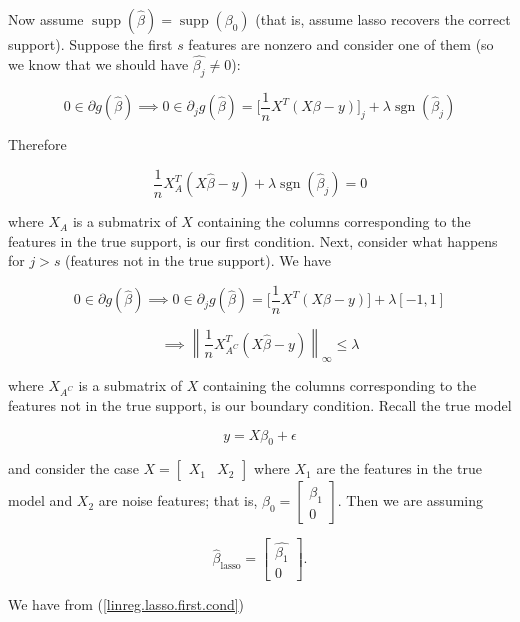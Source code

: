 Now assume \(\operatorname{supp}(\hat{\beta}) = \operatorname{supp}(\beta_0)\) (that is, assume lasso recovers the correct support). Suppose the first \(s\) features are nonzero and consider one of them (so we know that we should have \(\hat{\beta_j} \neq 0\)):

\[
0 \in \partial g(\hat{\beta}) \implies 0 \in \partial_j g(\hat{\beta}) = \bigg[ \frac{1}{n} X^T(X \beta - y) \bigg]_j + \lambda \operatorname{sgn}(\hat{\beta}_j) 
\]

Therefore

\begin{equation}\label{linreg.lasso.first.cond}
\frac{1}{n} X_A^T(X \hat{\beta} - y) + \lambda  \operatorname{sgn}(\hat{\beta}_j) = 0
\end{equation}

where \(X_A\) is a submatrix of \(X\) containing the columns corresponding to the features in the true support, is our first condition. Next, consider what happens for \(j > s\) (features not in the true support). We have

\[
0 \in \partial g(\hat{\beta}) \implies 0 \in \partial_j g(\hat{\beta}) = \bigg[ \frac{1}{n}X^T(X \beta - y) \bigg] + \lambda [-1, 1]
\]

\begin{equation}\label{linreg.lasso.bound.cond}
\implies \left\lVert \frac{1}{n} X_{A^C}^T (X \hat{\beta} - y) \right\rVert_\infty \leq \lambda
\end{equation}

where \(X_{A^C}\) is a submatrix of \(X\) containing the columns corresponding to the features not in the true support, is our boundary condition. Recall the true model

\[
y = X \beta_0 + \epsilon
\]

and consider the case \(X = \begin{bmatrix}X_1 & X_2 \end{bmatrix}\) where \(X_1\) are the features in the true model and \(X_2\) are noise features; that is, \(\beta_0 = \begin{bmatrix} \beta_1 \\ 0 \end{bmatrix}\). Then we are assuming

\[
\hat{\beta}_{\text{lasso}} = \begin{bmatrix} \hat{\beta_1} \\ 0 \end{bmatrix}.
\]

We have from (\ref{linreg.lasso.first.cond})

